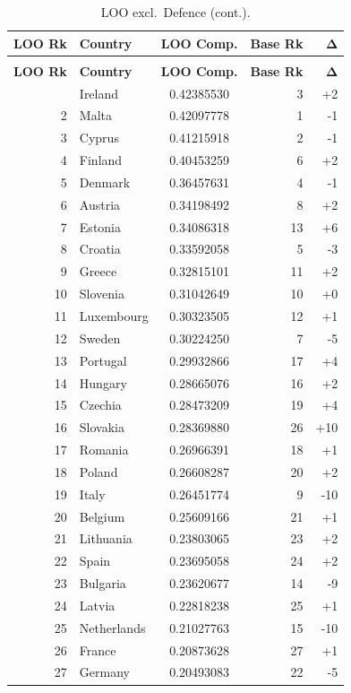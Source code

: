 \begin{longtable}{@{}rl S[table-format=1.8] r r@{}}
\caption{LOO ranking excluding Defence.  Spearman $\rho = 0.832723$, Kendall $\tau = 0.675214$.}
\label{tab:loo-defence}\\
\toprule
{\textbf{LOO Rk}} & {\textbf{Country}} & {\textbf{LOO Comp.}} & {\textbf{Base Rk}} & {$\boldsymbol{\Delta}$} \\
\midrule
\endfirsthead
\caption[]{LOO excl.\ Defence (cont.).}\\
\toprule
{\textbf{LOO Rk}} & {\textbf{Country}} & {\textbf{LOO Comp.}} & {\textbf{Base Rk}} & {$\boldsymbol{\Delta}$} \\
\midrule
\endhead
\bottomrule
{} & Ireland & 0.42385530 & 3 & +2 \\
  2 & Malta & 0.42097778 & 1 & -1 \\
  3 & Cyprus & 0.41215918 & 2 & -1 \\
  4 & Finland & 0.40453259 & 6 & +2 \\
  5 & Denmark & 0.36457631 & 4 & -1 \\
  6 & Austria & 0.34198492 & 8 & +2 \\
  7 & Estonia & 0.34086318 & 13 & +6 \\
  8 & Croatia & 0.33592058 & 5 & -3 \\
  9 & Greece & 0.32815101 & 11 & +2 \\
  10 & Slovenia & 0.31042649 & 10 & +0 \\
  11 & Luxembourg & 0.30323505 & 12 & +1 \\
  12 & Sweden & 0.30224250 & 7 & -5 \\
  13 & Portugal & 0.29932866 & 17 & +4 \\
  14 & Hungary & 0.28665076 & 16 & +2 \\
  15 & Czechia & 0.28473209 & 19 & +4 \\
  16 & Slovakia & 0.28369880 & 26 & +10 \\
  17 & Romania & 0.26966391 & 18 & +1 \\
  18 & Poland & 0.26608287 & 20 & +2 \\
  19 & Italy & 0.26451774 & 9 & -10 \\
  20 & Belgium & 0.25609166 & 21 & +1 \\
  21 & Lithuania & 0.23803065 & 23 & +2 \\
  22 & Spain & 0.23695058 & 24 & +2 \\
  23 & Bulgaria & 0.23620677 & 14 & -9 \\
  24 & Latvia & 0.22818238 & 25 & +1 \\
  25 & Netherlands & 0.21027763 & 15 & -10 \\
  26 & France & 0.20873628 & 27 & +1 \\
  27 & Germany & 0.20493083 & 22 & -5 \\
\end{longtable}